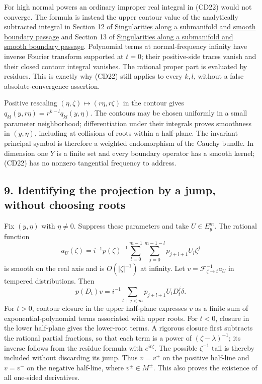 \documentclass[
  11pt,
]{article}
\begin{document}
For high normal powers an ordinary improper real integral in (CD22)
would not converge. The formula is instead the upper contour value of
the analytically subtracted integral in Section 12 of
\href{conormal-transmission.pdf}{Singularities along a submanifold and
smooth boundary passage} and Section 13 of
\href{conormal-transmission.pdf}{Singularities along a submanifold and
smooth boundary passage}. Polynomial terms at normal-frequency infinity
have inverse Fourier transform supported at \(t=0\); their positive-side
traces vanish and their closed contour integral vanishes. The rational
proper part is evaluated by residues. This is exactly why (CD22) still
applies to every \(k,l\), without a false absolute-convergence
assertion.

Positive rescaling \((\eta,\zeta)\mapsto(r\eta,r\zeta)\) in the contour
gives \(q_{kl}(y,r\eta)=r^{k-l}q_{kl}(y,\eta)\). The contours may be
chosen uniformly in a small parameter neighborhood; differentiation
under their integrals proves smoothness in \((y,\eta)\), including at
collisions of roots within a half-plane. The invariant principal symbol
is therefore a weighted endomorphism of the Cauchy bundle. In dimension
one \(Y\) is a finite set and every boundary operator has a smooth
kernel; (CD22) has no nonzero tangential frequency to address.

\subsection{9. Identifying the projection by a jump, without choosing
roots}\label{identifying-the-projection-by-a-jump-without-choosing-roots}

Fix \((y,\eta)\) with \(\eta\ne0\). Suppress these parameters and take
\(U\in E_y^m\). The rational function \[
a_U(\zeta)=i^{-1}p(\zeta)^{-1}
\sum_{l=0}^{m-1}\sum_{j=0}^{m-1-l}p_{j+l+1}U_l\zeta^j
\tag{CD23}
\] is smooth on the real axis and is \(O(|\zeta|^{-1})\) at infinity.
Let \(v=\mathcal F^{-1}_{\zeta\to t}a_U\) in tempered distributions.
Then \[
p(D_t)v=i^{-1}\sum_{l+j<m}p_{j+l+1}U_lD_t^j\delta.
\tag{CD24}
\] For \(t>0\), contour closure in the upper half-plane expresses \(v\)
as a finite sum of exponential-polynomial terms associated with upper
roots. For \(t<0\), closure in the lower half-plane gives the lower-root
terms. A rigorous closure first subtracts the rational partial
fractions, so that each term is a power of \((\zeta-\lambda)^{-1}\); its
inverse follows from the residue formula with \(e^{it\zeta}\). The
possible \(\zeta^{-1}\) tail is thereby included without discarding its
jump. Thus \(v=v^+\) on the positive half-line and \(v=v^-\) on the
negative half-line, where \(v^\pm\in M^\pm\). This also proves the
existence of all one-sided derivatives.
\end{document}
